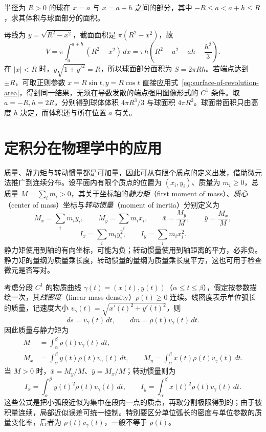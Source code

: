 \documentclass[UTF8,12pt,a4paper,fontset=fandol]{ctexbook}
\begin{document}
\begin{example}
\label{ex:spherical-zone-volume-and-area}
半径为 $R>0$ 的球在 $x=a$ 与 $x=a+h$ 之间的部分，其中 $-R\leq a<a+h\leq R$，求其体积与球面部分的面积。
\end{example}
\begin{solve}
母线为 $y=\sqrt{R^2-x^2}$，截面面积是 $\pi(R^2-x^2)$，故
\[
    V=\pi\int_a^{a+h}(R^2-x^2)\,dx
    =\pi h\left(R^2-a^2-ah-\frac{h^2}{3}\right).
\]
在 $|x|<R$ 时，$y\sqrt{1+y'^2}=R$，所以球面部分面积为 $S=2\pi Rh$。若端点达到 $\pm R$，可取正则参数 $x=R\sin t,y=R\cos t$ 直接应用式~\eqref{eq:surface-of-revolution-area}，得到同一结果，无须在导数发散的端点强用图像形式的 $C^1$ 条件。取 $a=-R,h=2R$，分别得到球体体积 $4\pi R^3/3$ 与球面积 $4\pi R^2$。球面带面积只由高度 $h$ 决定，而体积还与所在位置 $a$ 有关。
\end{solve}

\section{定积分在物理学中的应用}
\label{sec:physical-applications-of-definite-integrals}

质量、静力矩与转动惯量都是可加量，因此可从有限个质点的定义出发，借助微元法推广到连续分布。设平面内有限个质点的位置为 $(x_i,y_i)$、质量为 $m_i\geq0$，总质量 $M=\sum_i m_i>0$，其关于坐标轴的\emph{静力矩}（first moment of mass）、\emph{质心}（center of mass）坐标与\emph{转动惯量}（moment of inertia）分别定义为
\[
    M_x=\sum_i m_i y_i,\qquad M_y=\sum_i m_i x_i,\qquad
    \bar x=\frac{M_y}{M},\qquad \bar y=\frac{M_x}{M},
\]
\[
    I_x=\sum_i m_i y_i^2,\qquad I_y=\sum_i m_i x_i^2.
\]
静力矩使用到轴的有向坐标，可能为负；转动惯量使用到轴距离的平方，必非负。静力矩的量纲为质量乘长度，转动惯量的量纲为质量乘长度平方，这也可用于检查微元是否写对。

考虑分段 $C^1$ 的物质曲线 $\gamma(t)=(x(t),y(t))$（$\alpha\leq t\leq\beta$），假定按参数描绘一次，其\emph{线密度}（linear mass density）$\rho(t)\geq0$ 连续。线密度表示单位弧长的质量，记速度大小 $v_\gamma(t)=\sqrt{x'(t)^2+y'(t)^2}$，则
\[
    ds=v_\gamma(t)\,dt,\qquad dm=\rho(t)v_\gamma(t)\,dt.
\]
因此质量与静力矩为
\begin{equation}
    \begin{aligned}
        M&=\int_\alpha^\beta\rho(t)v_\gamma(t)\,dt,\\
        M_x&=\int_\alpha^\beta y(t)\rho(t)v_\gamma(t)\,dt,\qquad
        M_y=\int_\alpha^\beta x(t)\rho(t)v_\gamma(t)\,dt.
    \end{aligned}
    \label{eq:curve-mass-and-first-moments}
\end{equation}
当 $M>0$ 时，$\bar x=M_y/M$、$\bar y=M_x/M$；转动惯量则为
\begin{equation}
    I_x=\int_\alpha^\beta y(t)^2\rho(t)v_\gamma(t)\,dt,\qquad
    I_y=\int_\alpha^\beta x(t)^2\rho(t)v_\gamma(t)\,dt.
    \label{eq:curve-moments-of-inertia}
\end{equation}
这些公式是把小弧段近似为集中在段内一点的质点，再取分割极限得到的；由于被积量连续，局部近似误差可统一控制。特别要区分单位弧长的密度与单位参数的质量变化率，后者为 $\rho(t)v_\gamma(t)$，一般不等于 $\rho(t)$。
\end{document}
